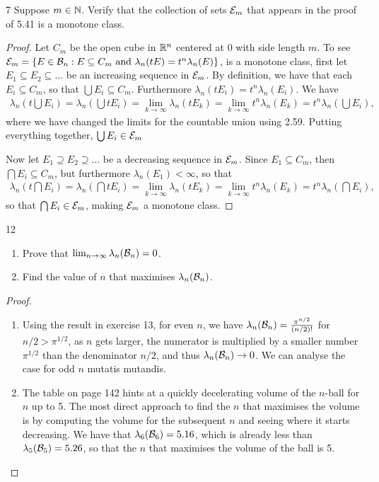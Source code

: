 \begin{exercise}{7}
Suppose $m \in \mathbb{N}$.
Verify that the collection of sets $\mathcal{E}_m$ that appears in the proof of 5.41 is a monotone class.
\end{exercise}
\begin{proof}
Let $C_m$ be the open cube in $\mathbb{R}^n$ centered at 0 with side length $m$.
To see$\mathcal{E}_m = \{E \in \mathcal{B}_n: E \subseteq C_m \text{ and } \lambda_n(tE) = t^n \lambda_n(E)\}$, is a monotone class, first let $E_1 \subseteq E_2 \subseteq \dots$ be an increasing sequence in $\mathcal{E}_m$.
By definition, we have that each $E_i \subseteq C_m$, so that $\bigcup E_i \subseteq C_m$.
Furthermore $\lambda_n(tE_i) = t^n \lambda_n(E_i)$. 
We have 
\begin{align*}
    \lambda_n(t \bigcup E_i)
    = \lambda_n(\bigcup t E_i)
    = \lim_{k \to \infty} \lambda_n(t E_k)
    = \lim_{k \to \infty} t^n \lambda_n(E_k)
    = t^n \lambda_n(\bigcup E_i),
\end{align*}
where we have changed the limits for the countable union using 2.59.
Putting everything together, $\bigcup E_i \in \mathcal{E}_m$

Now let $E_1 \supseteq E_2 \supseteq \dots$ be a decreasing sequence in $\mathcal{E}_m$.
Since $E_1 \subseteq C_m$, then $\bigcap E_i \subseteq C_m$, but furthermore $\lambda_n(E_1) < \infty$, so that
\begin{align*}
    \lambda_n(t \bigcap E_i)
    = \lambda_n(\bigcap t E_i)
    = \lim_{k \to \infty} \lambda_n(t E_k)
    = \lim_{k \to \infty} t^n \lambda_n(E_k)
    = t^n \lambda_n(\bigcap E_i),
\end{align*}
so that $\bigcap E_i \in \mathcal{E}_m$, making $\mathcal{E}_m$ a monotone class.
\end{proof} 

\begin{exercise}{12}
\begin{enumerate}
    \item Prove that $\lim_{n \to \infty} \lambda_n(\mathcal{B}_n) = 0$.
    \item Find the value of $n$ that maximises $\lambda_n(\mathcal{B}_n)$.
\end{enumerate}
\end{exercise}
\begin{proof}
\begin{enumerate}
    \item Using the result in exercise 13, for even $n$, we have $\lambda_n(\mathcal{B}_n) = \frac{\pi^{n/2}}{(n/2)!}$ for $n/2 > \pi^{1/2}$, as $n$ gets larger, the numerator is multiplied by a smaller number $\pi^{1/2}$ than the denominator $n/2$, and thus $\lambda_n(\mathcal{B}_n) \to 0$.
    We can analyse the case for odd $n$ mutatis mutandis.
    \item The table on page 142 hints at a quickly decelerating volume of the $n$-ball for $n$ up to 5.
    The most direct approach to find the $n$ that maximises the volume is by computing the volume for the subsequent $n$ and seeing where it starts decreasing.
    We have that $\lambda_6(\mathcal{B}_6) = 5.16$, which is already less than $\lambda_5(\mathcal{B}_5) = 5.26$, so that the $n$ that maximises the volume of the ball is 5.
\end{enumerate}
\end{proof} 

